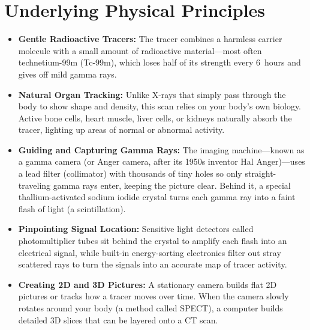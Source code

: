 \section{Underlying Physical Principles}
\begin{itemize}
\item \textbf{Gentle Radioactive Tracers:} The tracer combines a harmless carrier molecule with a small amount of radioactive material---most often technetium-99m (Tc-99m), which loses half of its strength every 6~hours and gives off mild gamma rays.
\item \textbf{Natural Organ Tracking:} Unlike X-rays that simply pass through the body to show shape and density, this scan relies on your body's own biology. Active bone cells, heart muscle, liver cells, or kidneys naturally absorb the tracer, lighting up areas of normal or abnormal activity.
\item \textbf{Guiding and Capturing Gamma Rays:} The imaging machine---known as a gamma camera (or Anger camera, after its 1950s inventor Hal Anger)---uses a lead filter (collimator) with thousands of tiny holes so only straight-traveling gamma rays enter, keeping the picture clear. Behind it, a special thallium-activated sodium iodide crystal turns each gamma ray into a faint flash of light (a scintillation).
\item \textbf{Pinpointing Signal Location:} Sensitive light detectors called photomultiplier tubes sit behind the crystal to amplify each flash into an electrical signal, while built-in energy-sorting electronics filter out stray scattered rays to turn the signals into an accurate map of tracer activity.
\item \textbf{Creating 2D and 3D Pictures:} A stationary camera builds flat 2D pictures or tracks how a tracer moves over time. When the camera slowly rotates around your body (a method called SPECT), a computer builds detailed 3D slices that can be layered onto a CT scan.
\end{itemize}

